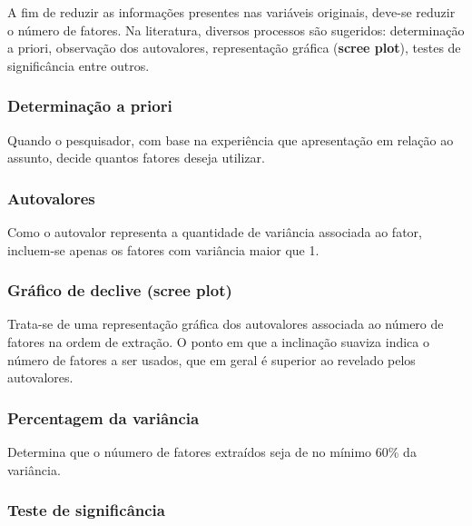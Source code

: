 \documentclass[12pt,brazil,oneside]{book}
\begin{document}
A fim de reduzir as informações presentes nas variáveis originais, deve-se reduzir o número de fatores. Na literatura, diversos processos são sugeridos: determinação a priori, observação dos autovalores, representação gráfica (\textbf{scree plot}), testes de significância entre outros.

\hypertarget{determinacao-a-priori}{%
\subsubsection{Determinação a priori}\label{determinacao-a-priori}}

Quando o pesquisador, com base na experiência que apresentação em relação ao assunto,
decide quantos fatores deseja utilizar.

\hypertarget{autovalores}{%
\subsubsection{Autovalores}\label{autovalores}}

Como o autovalor representa a quantidade de variância associada ao fator, incluem-se
apenas os fatores com variância maior que 1.

\hypertarget{grafico-de-declive-scree-plot}{%
\subsubsection{\texorpdfstring{Gráfico de declive (\textbf{scree plot})}{Gráfico de declive (scree plot)}}\label{grafico-de-declive-scree-plot}}

Trata-se de uma representação gráfica dos autovalores associada ao número de fatores na
ordem de extração. O ponto em que a inclinação suaviza indica o número de fatores a ser usados,
que em geral é superior ao revelado pelos autovalores.

\hypertarget{percentagem-da-variancia}{%
\subsubsection{Percentagem da variância}\label{percentagem-da-variancia}}

Determina que o núumero de fatores extraídos seja de no mínimo 60\% da variância.

\hypertarget{teste-de-significancia}{%
\subsubsection{Teste de significância}\label{teste-de-significancia}}
\end{document}
